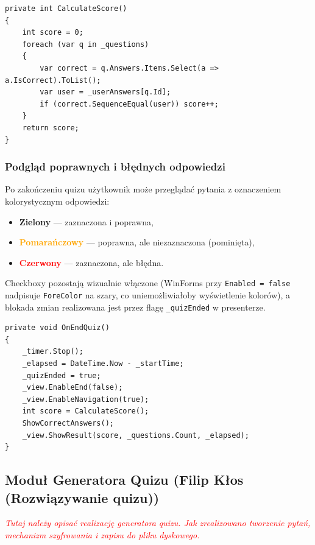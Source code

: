 \documentclass[12pt,a4paper]{article}
\def\authorB{Filip Kłos (Rozwiązywanie quizu)}
\newcommand\todo[1]{\textcolor{red}{#1}}
\begin{document}
\begin{lstlisting}
private int CalculateScore()
{
    int score = 0;
    foreach (var q in _questions)
    {
        var correct = q.Answers.Items.Select(a => a.IsCorrect).ToList();
        var user = _userAnswers[q.Id];
        if (correct.SequenceEqual(user)) score++;
    }
    return score;
}
\end{lstlisting}

\subsubsection{Podgląd poprawnych i błędnych odpowiedzi}

Po zakończeniu quizu użytkownik może przeglądać pytania z oznaczeniem kolorystycznym odpowiedzi:
\begin{itemize}
    \item \textcolor{green!60!black}{\textbf{Zielony}} --- zaznaczona i poprawna,
    \item \textcolor{orange}{\textbf{Pomarańczowy}} --- poprawna, ale niezaznaczona (pominięta),
    \item \textcolor{red}{\textbf{Czerwony}} --- zaznaczona, ale błędna.
\end{itemize}

Checkboxy pozostają wizualnie włączone (WinForms przy \texttt{Enabled = false} nadpisuje
\texttt{ForeColor} na szary, co uniemożliwiałoby wyświetlenie kolorów), a blokada zmian
realizowana jest przez flagę \texttt{\_quizEnded} w presenterze.

\begin{lstlisting}
private void OnEndQuiz()
{
    _timer.Stop();
    _elapsed = DateTime.Now - _startTime;
    _quizEnded = true;
    _view.EnableEnd(false);
    _view.EnableNavigation(true);
    int score = CalculateScore();
    ShowCorrectAnswers();
    _view.ShowResult(score, _questions.Count, _elapsed);
}
\end{lstlisting}


\subsection{Moduł Generatora Quizu (\authorB)}
\textit{\todo{Tutaj należy opisać realizację generatora quizu. Jak zrealizowano tworzenie pytań, mechanizm szyfrowania i zapisu do pliku dyskowego.}}



\end{document}
